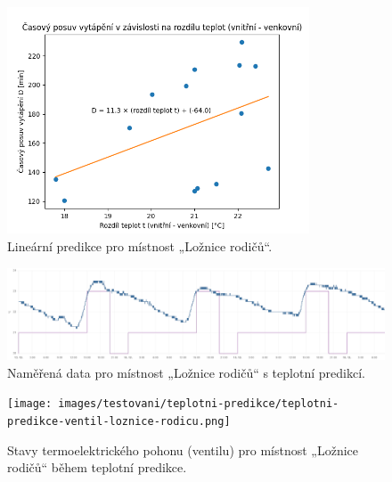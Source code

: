 \begin{figure}[H]
    \centering
    \includegraphics[width=0.8\textwidth]{images/testovani/teplotni-predikce/linearni-predikce.png}
    \caption{Lineární predikce pro místnost „Ložnice rodičů“.}
    \label{fig:linearni-predikce}
\end{figure}

\begin{figure}[H]
    \centering
    \includegraphics[width=\textwidth]{images/testovani/teplotni-predikce/teplotni-predikce-loznice-rodicu}
    \caption{Naměřená data pro místnost „Ložnice rodičů“ s teplotní predikcí.}
    \label{fig:teplotni-predikce-loznice-rodicu}
\end{figure}


\begin{figure}[H]
    \centering
    \texttt{[image: images/testovani/teplotni-predikce/teplotni-predikce-ventil-loznice-rodicu.png]}
    \caption{Stavy termoelektrického pohonu (ventilu) pro místnost „Ložnice rodičů“ během teplotní predikce.}
    \label{fig:teplotni-predikce-ventil-loznice-rodicu}
\end{figure}


